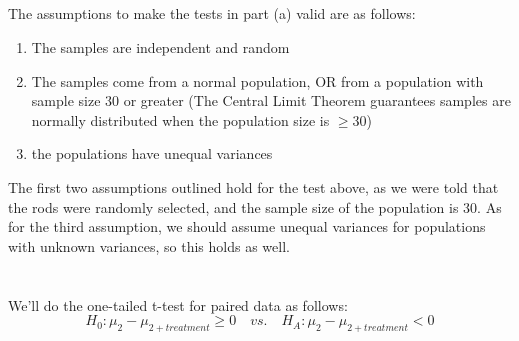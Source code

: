 \documentclass[letterpaper]{article}
\begin{document}
\subsection{}%

The assumptions to make the tests in part (a) valid are as follows:
\begin{enumerate}
 \item The samples are independent and random
 \item The samples come from a normal population,
       OR from a population with sample size 30 or greater
       (The Central Limit Theorem guarantees samples are normally distributed
       when the population size is $\geq 30$)
 \item the populations have unequal variances
\end{enumerate}

The first two assumptions outlined hold for the test above, as we were told that the
rods were randomly selected, and the sample size of the population is 30.
As for the third assumption, we should assume unequal variances for populations
with unknown variances, so this holds as well.

\section{}%

\subsection{}%

We'll do the one-tailed t-test for paired data as follows:\\
$$H_0: \mu_2 - \mu_{2+treatment} \geq 0  \quad vs. \quad H_A: \mu_2 - \mu_{2+treatment} < 0 $$
\end{document}
